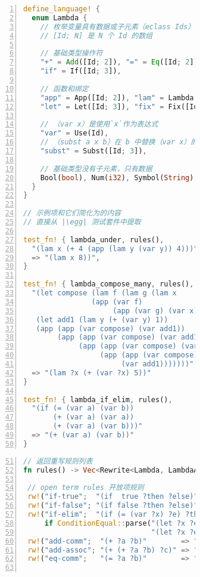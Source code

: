 \begin{figure}
\begin{subfigure}[t]{0.48\linewidth}
  \begin{lstlisting}[language=Rust, basicstyle=\tiny\ttfamily, numbers=left, escapechar=|]
define_language! {
  enum Lambda {
    // 枚举变量具有数据或子元素（eclass Ids）
    // [Id; N] 是 N 个 Id 的数组

    // 基础类型操作符
    "+" = Add([Id; 2]), "=" = Eq([Id; 2]),
    "if" = If([Id; 3]),

    // 函数和绑定
    "app" = App([Id; 2]), "lam" = Lambda([Id; 2]),
    "let" = Let([Id; 3]), "fix" = Fix([Id; 2]),

    // （var x）是使用`x`作为表达式
    "var" = Use(Id),
    // （subst a x b）在 b 中替换（var x）的 a
    "subst" = Subst([Id; 3]),

    // 基础类型没有子元素，只有数据
    Bool(bool), Num(i32), Symbol(String),
  }
}

// 示例项和它们简化为的内容
// 直接从 |\egg| 测试套件中提取

test_fn! { lambda_under, rules(),
  "(lam x (+ 4 (app (lam y (var y)) 4)))"
  => "(lam x 8))",
}

test_fn! { lambda_compose_many, rules(),
  "(let compose (lam f (lam g (lam x
                (app (var f)
                     (app (var g) (var x))))))
   (let add1 (lam y (+ (var y) 1))
   (app (app (var compose) (var add1))
        (app (app (var compose) (var add1))
             (app (app (var compose) (var add1))
                  (app (app (var compose) (var add1))
                       (var add1)))))))"
  => "(lam ?x (+ (var ?x) 5))"
}

test_fn! { lambda_if_elim, rules(),
  "(if (= (var a) (var b))
       (+ (var a) (var a))
       (+ (var a) (var b)))"
  => "(+ (var a) (var b))"
}\end{lstlisting}
\end{subfigure}
\hfill
\begin{subfigure}[t]{0.48\linewidth}
  \begin{lstlisting}[language=Rust, basicstyle=\tiny\ttfamily, escapechar=|, numbers=left, firstnumber=51]
// 返回重写规则列表
fn rules() -> Vec<Rewrite<Lambda, LambdaAnalysis>> { vec![

 // open term rules 开放项规则
 rw!("if-true";  "(if  true ?then ?else)" => "?then"),
 rw!("if-false"; "(if false ?then ?else)" => "?else"),
 rw!("if-elim";  "(if (= (var ?x) ?e) ?then ?else)" => "?else"
     if ConditionEqual::parse("(let ?x ?e ?then)",
                              "(let ?x ?e ?else)")),
 rw!("add-comm";  "(+ ?a ?b)"        => "(+ ?b ?a)"),
 rw!("add-assoc"; "(+ (+ ?a ?b) ?c)" => "(+ ?a (+ ?b ?c))"),
 rw!("eq-comm";   "(= ?a ?b)"        => "(= ?b ?a)"),


\end{lstlisting}
\end{subfigure}
\end{figure}
